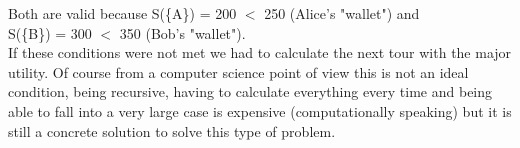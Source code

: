 \documentclass{article}
\begin{document}
Both are valid because S(\{A\}) = 200 $<$ 250 (Alice's "wallet") and \\S(\{B\}) = 300 $<$ 350 (Bob's "wallet"). \\If these conditions were not met we had to calculate the next tour with the major utility. Of course from a computer science point of view this is not an ideal condition, being recursive, having to calculate everything every time and being able to fall into a very large case is expensive (computationally speaking) but it is still a concrete solution to solve this type of problem.
\end{document}
